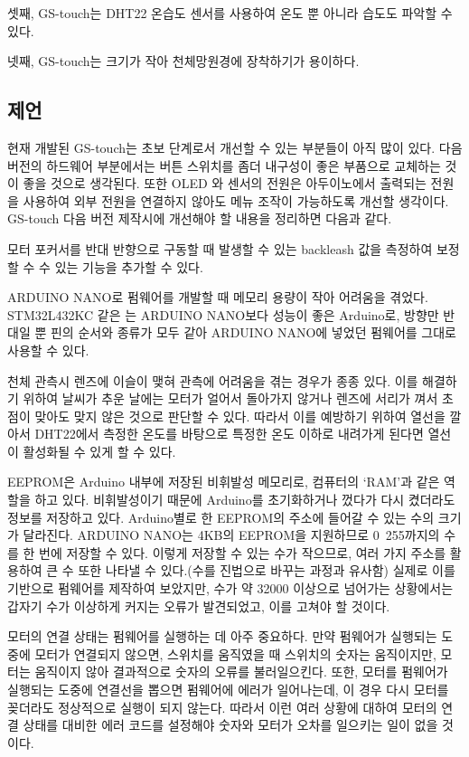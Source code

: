 셋째, GS-touch는 DHT22 온습도 센서를 사용하여 온도 뿐 아니라 습도도 파악할 수 있다. 

넷째, GS-touch는 크기가 작아 천체망원경에 장착하기가 용이하다. 

\subsection{제언}

현재 개발된 GS-touch는 초보 단계로서 개선할 수 있는 부분들이 아직 많이 있다. 다음 버전의 하드웨어 부분에서는 버튼 스위치를 좀더 내구성이 좋은 부품으로 교체하는 것이 좋을 것으로 생각된다. 또한 OLED 와 센서의 전원은 아두이노에서 출력되는 전원을 사용하여 외부 전원을 연결하지 않아도 메뉴 조작이 가능하도록 개선할 생각이다. GS-touch 다음 버전 제작시에 개선해야 할 내용을 정리하면 다음과 같다. 

\begin{description}[font=$\bullet$~\normalfont\scshape\color{red!50!black}]
	\item [Backleash 보정 기능 추가] 모터 포커서를 반대 반향으로 구동할 때 발생할 수 있는 backleash 값을 측정하여 보정할 수 수 있는 기능을 추가할 수 있다.
	\item [MCU 변경] ARDUINO NANO로 펌웨어를 개발할 때 메모리 용량이 작아 어려움을 겪었다. STM32L432KC 같은 는 ARDUINO NANO보다 성능이 좋은 Arduino로, 방향만 반대일 뿐 핀의 순서와 종류가 모두 같아 ARDUINO NANO에 넣었던 펌웨어를 그대로 사용할 수 있다.
	\item [Heating system 추가] 천체 관측시 렌즈에 이슬이 맺혀 관측에 어려움을 겪는 경우가 종종 있다. 이를 해결하기 위하여 날씨가 추운 날에는 모터가 얼어서 돌아가지 않거나 렌즈에 서리가 껴서 초점이 맞아도 맞지 않은 것으로 판단할 수 있다. 따라서 이를 예방하기 위하여 열선을 깔아서 DHT22에서 측정한 온도를 바탕으로 특정한 온도 이하로 내려가게 된다면 열선이 활성화될 수 있게 할 수 있다.
	\item [EEPROM 활용] EEPROM은 Arduino 내부에 저장된 비휘발성 메모리로, 컴퓨터의 ‘RAM’과 같은 역할을 하고 있다. 비휘발성이기 때문에 Arduino를 초기화하거나 껐다가 다시 켰더라도 정보를 저장하고 있다. 
	Arduino별로 한 EEPROM의 주소에 들어갈 수 있는 수의 크기가 달라진다. ARDUINO NANO는 4KB의 EEPROM을 지원하므로 0~255까지의 수를 한 번에 저장할 수 있다. 이렇게 저장할 수 있는 수가 작으므로, 여러 가지 주소를 활용하여 큰 수 또한 나타낼 수 있다.(수를 진법으로 바꾸는 과정과 유사함) 실제로 이를 기반으로 펌웨어를 제작하여 보았지만, 수가 약 32000 이상으로 넘어가는 상황에서는 갑자기 수가 이상하게 커지는 오류가 발견되었고, 이를 고쳐야 할 것이다.
	\item [모터 연결 상태 체크 기능 추가] 모터의 연결 상태는 펌웨어를 실행하는 데 아주 중요하다. 만약 펌웨어가 실행되는 도중에 모터가 연결되지 않으면, 스위치를 움직였을 때 스위치의 숫자는 움직이지만, 모터는 움직이지 않아 결과적으로 숫자의 오류를 불러일으킨다. 또한, 모터를 펌웨어가 실행되는 도중에 연결선을 뽑으면 펌웨어에 에러가 일어나는데, 이 경우 다시 모터를 꽂더라도 정상적으로 실행이 되지 않는다. 따라서 이런 여러 상황에 대하여 모터의 연결 상태를 대비한 에러 코드를 설정해야 숫자와 모터가 오차를 일으키는 일이 없을 것이다.
\end{description}

